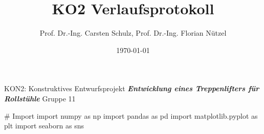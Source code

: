 \documentclass[10pt,a4paper]{article}
\author{{\LARGE Prof. Dr.-Ing. Carsten Schulz, Prof. Dr.-Ing. Florian Nützel}}
\title{\textbf{{\Huge KO2 Verlaufsprotokoll}}}
\date{{\Large \today}}
\begin{document}
\maketitle
\begin{center}
    \Large KON2: Konstruktives Entwurfsprojekt
    \vspace{1cm}
    \textbf{\textit{Entwicklung eines Treppenlifters für Rollstühle}}
    \vspace{1cm}
    {\Large Gruppe 11}
\end{center}
# Import
import numpy as np
import pandas as pd
import matplotlib.pyplot as plt
import seaborn as sns
\end{document}
